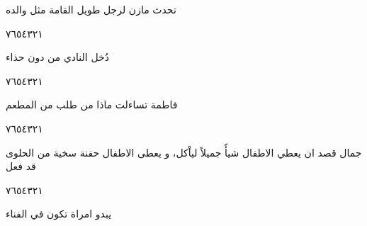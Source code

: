 \documentclass[11pt, a4paper]{article}
\begin{document}
{\vspace{0.5\baselineskip}\begin{flushright}
\textarabic{تحدث مازن لرجل طويل القامة مثل والده}
\end{flushright}

\begin{center}
        \hfill\textarabic{٧}\hfill\textarabic{٦}\hfill\textarabic{٥}\hfill\textarabic{٤}\hfill\textarabic{٣}\hfill\textarabic{٢}\hfill\textarabic{١}
        \end{center}

\vfill\clearpage

\vspace{0.5\baselineskip}\begin{flushright}
\textarabic{دُخل النادي من دون حذاء}
\end{flushright}

\begin{center}
        \hfill\textarabic{٧}\hfill\textarabic{٦}\hfill\textarabic{٥}\hfill\textarabic{٤}\hfill\textarabic{٣}\hfill\textarabic{٢}\hfill\textarabic{١}
        \end{center}


\vspace{0.5\baselineskip}\begin{flushright}
\textarabic{فاطمة تساءلت ماذا من طلب من المطعم}
\end{flushright}

\begin{center}
        \hfill\textarabic{٧}\hfill\textarabic{٦}\hfill\textarabic{٥}\hfill\textarabic{٤}\hfill\textarabic{٣}\hfill\textarabic{٢}\hfill\textarabic{١}
        \end{center}


\vspace{0.5\baselineskip}\begin{flushright}
\textarabic{جمال قصد ان يعطي الاطفال شيأً جميلاً لياْكل، و يعطى الاطفال حفنة سخية من الحلوى قد فعل}
\end{flushright}

\begin{center}
        \hfill\textarabic{٧}\hfill\textarabic{٦}\hfill\textarabic{٥}\hfill\textarabic{٤}\hfill\textarabic{٣}\hfill\textarabic{٢}\hfill\textarabic{١}
        \end{center}


\vspace{0.5\baselineskip}\begin{flushright}
\textarabic{يبدو امراة تكون في الفناء}
\end{flushright}

}
\end{document}
